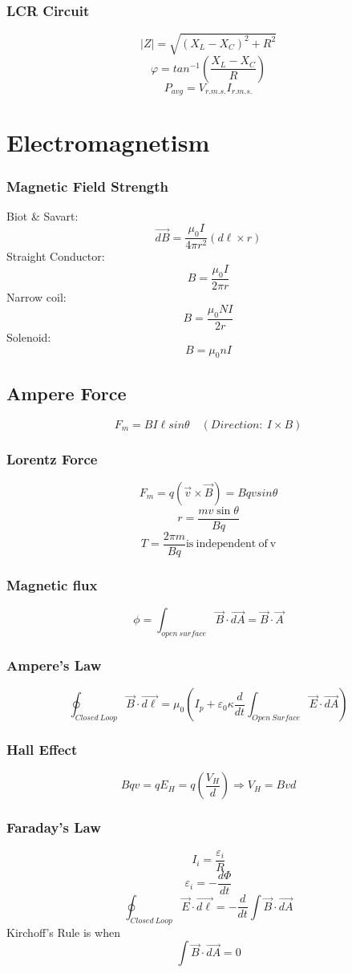 \documentclass{article}
\begin{document}
\subsubsection*{LCR Circuit}
\[|Z|=\sqrt{(X_L-X_C)^2+R^2}\]
\[\varphi=tan^{-1}(\frac{X_L-X_C}{R})\]
\[P_{avg}=V_{r.m.s.}I_{r.m.s.}\]

\section{Electromagnetism}
\subsubsection*{Magnetic Field Strength}
Biot \& Savart:
\[\vec{dB}=\frac{\mu_0 I}{4\pi r^2}(d\ell \times \hat{r})\]
Straight Conductor:
\[B=\frac{\mu_0 I}{2\pi r}\]
Narrow coil:
\[B=\frac{\mu_0 NI}{2r}\]
Solenoid:
\[B=\mu_0 nI\]

\subsection*{Ampere Force}
\[F_m=BI\ell sin\theta \quad (Direction:\ I \times B)\]

\subsubsection*{Lorentz Force}
\[F_m=q(\vec{v}\times\vec{B})=Bqv sin\theta\]
\[r=\frac{mv\sin\theta}{Bq}\]
\[T=\frac{2\pi m}{Bq} \mathrm{is\ independent\ of\ v}\]

\subsubsection*{Magnetic flux}
\[\phi=\int_{open\ surface}\vec{B}\cdot\vec{dA}=\vec{B}\cdot\vec{A}\]

\subsubsection*{Ampere's Law}
\[\oint_{Closed\ Loop}\vec{B}\cdot\vec{d\ell}=\mu_0(I_p+\varepsilon_0\kappa\frac{d}{dt}\int_{Open\ Surface}\vec{E}\cdot\vec{dA})\]

\subsubsection*{Hall Effect}
\[Bqv=qE_H=q(\frac{V_H}{d})\Rightarrow V_H=Bvd\]

\subsubsection*{Faraday's Law}
\[I_i=\frac{\varepsilon_i}{R}\]
\[\varepsilon_i=-\frac{d\Phi}{dt}\]
\[\oint_{Closed\ Loop}\vec{E}\cdot \vec{d\ell}=-\frac{d}{dt}\int\vec{B}\cdot\vec{dA}\]
Kirchoff's Rule is when 
\[\int\vec{B}\cdot\vec{dA}=0\]
\end{document}
